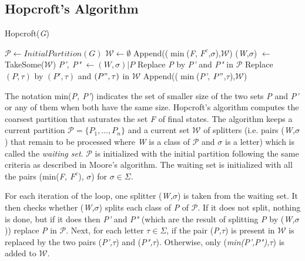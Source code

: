 {\subsection{Hopcroft's Algorithm}

\begin{algorithm} 
  \caption{Hopcroft(\textit{G})\label{alg:hop}}
    \begin{algorithmic}[1]
      \State $\mathcal{P} \leftarrow InitialPartition(G)$
      \State $\mathcal{W} \leftarrow \emptyset$
      \ForAll{$\sigma \in \Sigma$}
      	\State Append(($\min$(\textit{F}, $F^c$,$\sigma$),$\mathcal{W}$)
      		\State (\textit{W},$\sigma$) $\leftarrow$ TakeSome($\mathcal{W}$)
				\State \textit{P', P"} $\leftarrow (W,\sigma)|P$      		
				Replace \textit{P} by \textit{P'} and \textit{P"} in $\mathcal{P}$
				\ForAll{$\tau \in \Sigma$}
						\State Replace $(P,\tau)$ by $(P',\tau)$ and $(P",\tau)$ in $\mathcal{W}$
					\Else
						\State Append(($\min$(\textit{P'}, $P"$,$\tau$),$\mathcal{W}$)				
					\EndIf				
				\EndFor 
      		\EndFor
      	\EndWhile
      \EndFor
    \end{algorithmic}
  \end{algorithm}

The notation min(\textit{P, P'}) indicates the set of smaller size of the two sets \textit{P} and \textit{P'} or any of them when both have the same size. Hopcroft's algorithm computes the coarsest partition that saturates the set \textit{F} of final states. The algorithm keeps a current partition $\mathcal{P} = \{P_1, \ldots, P_n\}$ and a current set $\mathcal{W}$ of splitters (i.e. pairs (\textit{W,$\sigma$}) that remain to be processed where \textit{W} is a class of $\mathcal{P}$ and $\sigma$ is a letter) which is called the \textit{waiting set}. $\mathcal{P}$ is initialized with the initial partition following the same criteria as described in Moore's algorithm. The waiting set is initialized with all the pairs (min(\textit{F, $F^c$}), $\sigma$) for $\sigma\in\Sigma$.

For each iteration of the loop, one splitter (\textit{W,$\sigma$}) is taken from the waiting set. It then checks whether (\textit{W,$\sigma$}) splits each class of \textit{P} of $\mathcal{P}$. If it does not split, nothing is done, but if it does then \textit{P'} and \textit{P"} (which are the result of splitting \textit{P} by (\textit{W,$\sigma$})) replace \textit{P} in $\mathcal{P}$. Next, for each letter $\tau\in\Sigma$, if the pair (\textit{P,$\tau$}) is present in $\mathcal{W}$ is replaced by the two pairs (\textit{P',$\tau$}) and (\textit{P",$\tau$}). Otherwise, only (\textit{min(P',P"),$\tau$}) is added to $\mathcal{W}$.

}
